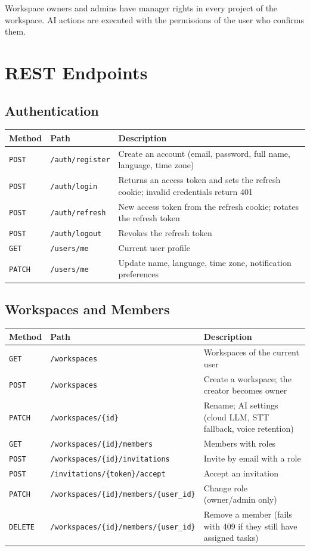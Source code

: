 \documentclass[11pt,a4paper]{article}
\newcommand{\tblstart}{\small\rowcolors{2}{gray!7}{white}}
\newcommand{\code}[1]{\texttt{#1}}
\newcommand{\GET}{\textcolor{green!45!black}{\texttt{GET}}}
\newcommand{\POST}{\textcolor{blue!60!black}{\texttt{POST}}}
\newcommand{\PATCH}{\textcolor{orange!80!black}{\texttt{PATCH}}}
\newcommand{\DEL}{\textcolor{red!65!black}{\texttt{DELETE}}}
\begin{document}
Workspace owners and admins have manager rights in every project of the workspace. AI actions are executed with the permissions of the user who confirms them.

\section{REST Endpoints}

\subsection{Authentication}
{\tblstart
\begin{xltabular}{\textwidth}{P{1.3cm} P{6.6cm} L}
\toprule
\textbf{Method} & \textbf{Path} & \textbf{Description} \\
\midrule
\endhead
\POST & \code{/auth/register} & Create an account (email, password, full name, language, time zone) \\
\POST & \code{/auth/login} & Returns an access token and sets the refresh cookie; invalid credentials return 401 \\
\POST & \code{/auth/refresh} & New access token from the refresh cookie; rotates the refresh token \\
\POST & \code{/auth/logout} & Revokes the refresh token \\
\GET & \code{/users/me} & Current user profile \\
\PATCH & \code{/users/me} & Update name, language, time zone, notification preferences \\
\bottomrule
\end{xltabular}}

\subsection{Workspaces and Members}
{\tblstart
\begin{xltabular}{\textwidth}{P{1.3cm} P{6.6cm} L}
\toprule
\textbf{Method} & \textbf{Path} & \textbf{Description} \\
\midrule
\endhead
\GET & \code{/workspaces} & Workspaces of the current user \\
\POST & \code{/workspaces} & Create a workspace; the creator becomes owner \\
\PATCH & \code{/workspaces/\{id\}} & Rename; AI settings (cloud LLM, STT fallback, voice retention) \\
\GET & \code{/workspaces/\{id\}/members} & Members with roles \\
\POST & \code{/workspaces/\{id\}/invitations} & Invite by email with a role \\
\POST & \code{/invitations/\{token\}/accept} & Accept an invitation \\
\PATCH & \code{/workspaces/\{id\}/members/\{user\_id\}} & Change role (owner/admin only) \\
\DEL & \code{/workspaces/\{id\}/members/\{user\_id\}} & Remove a member (fails with 409 if they still have assigned tasks) \\
\bottomrule
\end{xltabular}}
\end{document}
